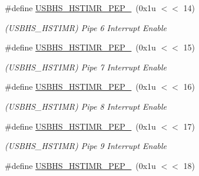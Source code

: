 \begin{DoxyCompactItemize}
\mbox{\label{group__SAMV71__USBHS_gad408856b09c79f2fda29bd4d14f8ed41}} 
\#define \mbox{\hyperlink{group__SAMV71__USBHS_gad408856b09c79f2fda29bd4d14f8ed41}{U\+S\+B\+H\+S\+\_\+\+H\+S\+T\+I\+M\+R\+\_\+\+P\+E\+P\+\_}}~(0x1u $<$$<$ 14)
\begin{DoxyCompactList}\small\item\em (U\+S\+B\+H\+S\+\_\+\+H\+S\+T\+I\+MR) Pipe 6 Interrupt Enable \end{DoxyCompactList}\item 
\mbox{\label{group__SAMV71__USBHS_ga15aaace81792c52e2bf71540dbaee3c6}} 
\#define \mbox{\hyperlink{group__SAMV71__USBHS_ga15aaace81792c52e2bf71540dbaee3c6}{U\+S\+B\+H\+S\+\_\+\+H\+S\+T\+I\+M\+R\+\_\+\+P\+E\+P\+\_}}~(0x1u $<$$<$ 15)
\begin{DoxyCompactList}\small\item\em (U\+S\+B\+H\+S\+\_\+\+H\+S\+T\+I\+MR) Pipe 7 Interrupt Enable \end{DoxyCompactList}\item 
\mbox{\label{group__SAMV71__USBHS_ga58617dbb47d40379dd6f52bf457b61d0}} 
\#define \mbox{\hyperlink{group__SAMV71__USBHS_ga58617dbb47d40379dd6f52bf457b61d0}{U\+S\+B\+H\+S\+\_\+\+H\+S\+T\+I\+M\+R\+\_\+\+P\+E\+P\+\_}}~(0x1u $<$$<$ 16)
\begin{DoxyCompactList}\small\item\em (U\+S\+B\+H\+S\+\_\+\+H\+S\+T\+I\+MR) Pipe 8 Interrupt Enable \end{DoxyCompactList}\item 
\mbox{\label{group__SAMV71__USBHS_ga2e7d41188448729a8492aa7c0f3fbb81}} 
\#define \mbox{\hyperlink{group__SAMV71__USBHS_ga2e7d41188448729a8492aa7c0f3fbb81}{U\+S\+B\+H\+S\+\_\+\+H\+S\+T\+I\+M\+R\+\_\+\+P\+E\+P\+\_}}~(0x1u $<$$<$ 17)
\begin{DoxyCompactList}\small\item\em (U\+S\+B\+H\+S\+\_\+\+H\+S\+T\+I\+MR) Pipe 9 Interrupt Enable \end{DoxyCompactList}\item 
\mbox{\label{group__SAMV71__USBHS_gadf35e21d17ce04631222332ce437d27c}} 
\#define \mbox{\hyperlink{group__SAMV71__USBHS_gadf35e21d17ce04631222332ce437d27c}{U\+S\+B\+H\+S\+\_\+\+H\+S\+T\+I\+M\+R\+\_\+\+P\+E\+P\+\_}}~(0x1u $<$$<$ 18)
$$
\end{DoxyCompactItemize}
